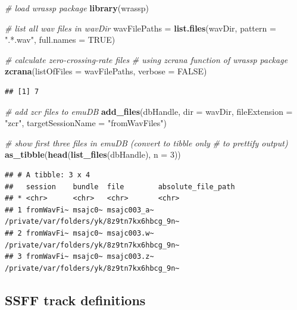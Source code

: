 \documentclass[]{book}
\newenvironment{Shaded}{\begin{snugshade}}{\end{snugshade}}
\newcommand{\CommentTok}[1]{\textcolor[rgb]{0.56,0.35,0.01}{\textit{#1}}}
\newcommand{\DataTypeTok}[1]{\textcolor[rgb]{0.13,0.29,0.53}{#1}}
\newcommand{\DecValTok}[1]{\textcolor[rgb]{0.00,0.00,0.81}{#1}}
\newcommand{\KeywordTok}[1]{\textcolor[rgb]{0.13,0.29,0.53}{\textbf{#1}}}
\newcommand{\NormalTok}[1]{#1}
\newcommand{\OtherTok}[1]{\textcolor[rgb]{0.56,0.35,0.01}{#1}}
\newcommand{\StringTok}[1]{\textcolor[rgb]{0.31,0.60,0.02}{#1}}
\theoremstyle{definition}
\theoremstyle{definition}
\theoremstyle{definition}
\theoremstyle{remark}
\begin{document}
\begin{Shaded}
\begin{Highlighting}[]
\CommentTok{# load wrassp package}
\KeywordTok{library}\NormalTok{(wrassp)}

\CommentTok{# list all wav files in wavDir}
\NormalTok{wavFilePaths =}\StringTok{ }\KeywordTok{list.files}\NormalTok{(wavDir,}
                          \DataTypeTok{pattern =} \StringTok{".*.wav"}\NormalTok{,}
                          \DataTypeTok{full.names =} \OtherTok{TRUE}\NormalTok{)}

\CommentTok{# calculate zero-crossing-rate files}
\CommentTok{# using zcrana function of wrassp package}
\KeywordTok{zcrana}\NormalTok{(}\DataTypeTok{listOfFiles =}\NormalTok{ wavFilePaths,}
       \DataTypeTok{verbose =} \OtherTok{FALSE}\NormalTok{)}
\end{Highlighting}
\end{Shaded}

\begin{verbatim}
## [1] 7
\end{verbatim}

\begin{Shaded}
\begin{Highlighting}[]
\CommentTok{# add zcr files to emuDB}
\KeywordTok{add_files}\NormalTok{(dbHandle,}
          \DataTypeTok{dir =}\NormalTok{ wavDir,}
          \DataTypeTok{fileExtension =} \StringTok{"zcr"}\NormalTok{,}
          \DataTypeTok{targetSessionName =} \StringTok{"fromWavFiles"}\NormalTok{)}

\CommentTok{# show first three files in emuDB (convert to tibble only}
\CommentTok{# to prettify output)}
\KeywordTok{as_tibble}\NormalTok{(}\KeywordTok{head}\NormalTok{(}\KeywordTok{list_files}\NormalTok{(dbHandle), }\DataTypeTok{n =} \DecValTok{3}\NormalTok{))}
\end{Highlighting}
\end{Shaded}

\begin{verbatim}
## # A tibble: 3 x 4
##   session    bundle  file        absolute_file_path                       
## * <chr>      <chr>   <chr>       <chr>                                    
## 1 fromWavFi~ msajc0~ msajc003_a~ /private/var/folders/yk/8z9tn7kx6hbcg_9n~
## 2 fromWavFi~ msajc0~ msajc003.w~ /private/var/folders/yk/8z9tn7kx6hbcg_9n~
## 3 fromWavFi~ msajc0~ msajc003.z~ /private/var/folders/yk/8z9tn7kx6hbcg_9n~
\end{verbatim}

\hypertarget{ssff-track-definitions}{%
\subsection{SSFF track definitions}\label{ssff-track-definitions}}
\end{document}
